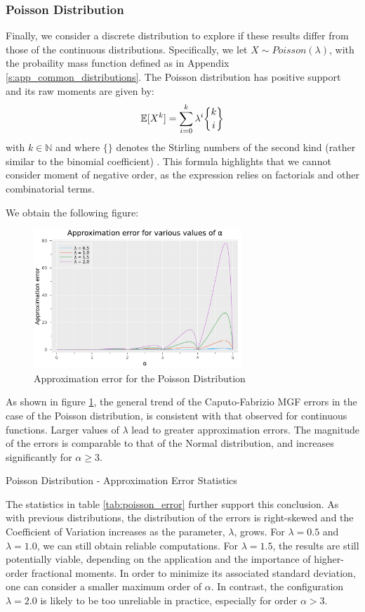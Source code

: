 \subsubsection{Poisson Distribution}
Finally, we consider a discrete distribution to explore if these results differ from those of the continuous distributions. Specifically, we let \(X \sim Poisson(\lambda)\), with the probaility mass function defined as in Appendix \ref{s:app_common_distributions}. The Poisson distribution has positive support and its raw moments are given by: \[\mathbb{E}[X^k] = \sum_{i = 0}^{k} \lambda^i \stirlingii{k}{i}\] with \(k \in \mathbb{N}\) and where \(\{\}\) denotes the Stirling numbers of the second kind (rather similar to the binomial coefficient) \cite{haight1967}. This formula highlights that we cannot consider moment of negative order, as the expression relies on factorials and other combinatorial terms.

We obtain the following figure:
\begin{figure}[H]
    \centering
    \includegraphics[width=0.7\textwidth]{figures/error_plot_poisson.pdf}
    \caption{Approximation error for the Poisson Distribution}
    \label{fig:poisson_plot_error}
\end{figure}
As shown in figure \ref{fig:poisson_plot_error}, the general trend of the Caputo-Fabrizio MGF errors in the case of the Poisson distribution, is consistent with that observed for continuous functions. Larger values of \(\lambda\) lead to greater approximation errors. The magnitude of the errors is comparable to that of the Normal distribution, and increases significantly for \(\alpha \geq 3\).


\begin{table}[H]
    \centering

\caption{Poisson Distribution - Approximation Error Statistics} 
\label{tab:poisson_error}
\end{table}
The statistics in table \ref{tab:poisson_error} further support this conclusion.
As with previous distributions, the distribution of the errors is right-skewed and the Coefficient of Variation increases as the parameter, \(\lambda\), grows.
For \(\lambda = 0.5\) and \(\lambda = 1.0\), we can still obtain reliable computations. For \(\lambda = 1.5\), the results are still potentially viable, depending on the application and the importance of higher-order fractional moments. In order to minimize its associated standard deviation, one can consider a smaller maximum order of \(\alpha\). In contrast, the configuration \(\lambda = 2.0\) is likely to be too unreliable in practice, especially for order \(\alpha > 3\).

